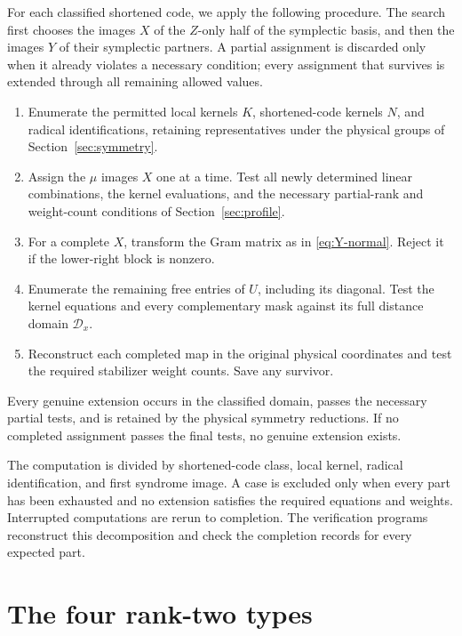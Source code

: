 \documentclass[11pt]{article}
\theoremstyle{definition}
\theoremstyle{remark}
\begin{document}
For each classified shortened code, we apply the following procedure.
The search first chooses the images \(X\) of the \(Z\)-only half of the
symplectic basis, and then the images \(Y\) of their symplectic
partners. A partial assignment is discarded only when it already
violates a necessary condition; every assignment that survives is
extended through all remaining allowed values.
\begin{enumerate}[label=\arabic*.]
\item Enumerate the permitted local kernels \(K\), shortened-code
kernels \(N\), and radical identifications, retaining representatives
under the physical groups of Section~\ref{sec:symmetry}.
\item Assign the \(\mu\) images \(X\) one at a time. Test all newly
determined linear combinations, the kernel evaluations, and the
necessary partial-rank and weight-count conditions of
Section~\ref{sec:profile}.
\item For a complete \(X\), transform the Gram matrix as in
\eqref{eq:Y-normal}. Reject it if the lower-right block is nonzero.
\item Enumerate the remaining free entries of \(U\), including its
diagonal. Test the kernel equations and every complementary mask
against its full distance domain \(\mathcal D_x\).
\item Reconstruct each completed map in the original physical coordinates
and test the required stabilizer weight counts. Save any survivor.
\end{enumerate}
Every genuine extension occurs in the classified domain, passes the
necessary partial tests, and is retained by the physical symmetry
reductions. If no completed assignment passes the final tests, no
genuine extension exists.

The computation is divided by shortened-code class, local kernel,
radical identification, and first syndrome image. A case is excluded
only when every part has been exhausted and no extension satisfies the
required equations and weights. Interrupted computations are rerun to
completion. The verification programs reconstruct this decomposition and
check the completion records for every expected part.

\section{The four rank-two types}\label{sec:rank-two}
\end{document}
